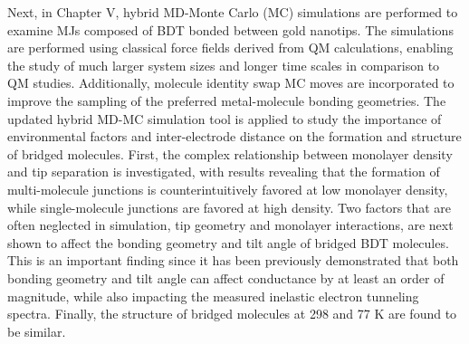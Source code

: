 \documentclass[10pt]{report}  %
\begin{document}
Next, in Chapter V, hybrid MD-Monte Carlo (MC) simulations \cite{Pu:2010} are performed to examine MJs composed of BDT bonded between gold nanotips.\cite{French:2012} The simulations are performed using classical force fields derived from QM calculations,\cite{Leng:2007} enabling the study of much larger system sizes and longer time scales in comparison to QM studies. Additionally, molecule identity swap MC moves are incorporated to improve the sampling of the preferred metal-molecule bonding geometries. The updated hybrid MD-MC simulation tool is applied to study the importance of environmental factors and inter-electrode distance on the formation and structure of bridged molecules. First, the complex relationship between monolayer density and tip separation is investigated, with results revealing that the formation of multi-molecule junctions is counterintuitively favored at low monolayer density, while single-molecule junctions are favored at high density. Two factors that are often neglected in simulation, \cite{Emberly:2001,Weber:2002,Li:2008,Mishchenko:2010,Frei:2011} tip geometry and monolayer interactions, are next shown to affect the bonding geometry and tilt angle of bridged BDT molecules. This is an important finding since  it has been previously demonstrated that both bonding geometry and tilt angle can affect conductance by at least an order of magnitude,\cite{Tsutsui:2006,Kim:2011,Bratkovsky:2003,Haiss:2008} while also impacting the measured inelastic electron tunneling spectra. \cite{Lin:2011} Finally, the structure of bridged molecules at 298 and 77 K are found to be similar.  
\end{document}
